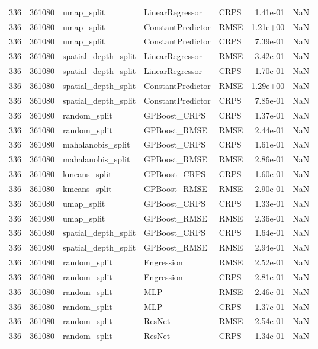 \begin{tabular}{rrlllrr}
336 & 361080 & umap\_split & LinearRegressor & CRPS & 1.41e-01 & NaN \\
336 & 361080 & umap\_split & ConstantPredictor & RMSE & 1.21e+00 & NaN \\
336 & 361080 & umap\_split & ConstantPredictor & CRPS & 7.39e-01 & NaN \\
336 & 361080 & spatial\_depth\_split & LinearRegressor & RMSE & 3.42e-01 & NaN \\
336 & 361080 & spatial\_depth\_split & LinearRegressor & CRPS & 1.70e-01 & NaN \\
336 & 361080 & spatial\_depth\_split & ConstantPredictor & RMSE & 1.29e+00 & NaN \\
336 & 361080 & spatial\_depth\_split & ConstantPredictor & CRPS & 7.85e-01 & NaN \\
336 & 361080 & random\_split & GPBoost\_CRPS & CRPS & 1.37e-01 & NaN \\
336 & 361080 & random\_split & GPBoost\_RMSE & RMSE & 2.44e-01 & NaN \\
336 & 361080 & mahalanobis\_split & GPBoost\_CRPS & CRPS & 1.61e-01 & NaN \\
336 & 361080 & mahalanobis\_split & GPBoost\_RMSE & RMSE & 2.86e-01 & NaN \\
336 & 361080 & kmeans\_split & GPBoost\_CRPS & CRPS & 1.60e-01 & NaN \\
336 & 361080 & kmeans\_split & GPBoost\_RMSE & RMSE & 2.90e-01 & NaN \\
336 & 361080 & umap\_split & GPBoost\_CRPS & CRPS & 1.33e-01 & NaN \\
336 & 361080 & umap\_split & GPBoost\_RMSE & RMSE & 2.36e-01 & NaN \\
336 & 361080 & spatial\_depth\_split & GPBoost\_CRPS & CRPS & 1.64e-01 & NaN \\
336 & 361080 & spatial\_depth\_split & GPBoost\_RMSE & RMSE & 2.94e-01 & NaN \\
336 & 361080 & random\_split & Engression & RMSE & 2.52e-01 & NaN \\
336 & 361080 & random\_split & Engression & CRPS & 2.81e-01 & NaN \\
336 & 361080 & random\_split & MLP & RMSE & 2.46e-01 & NaN \\
336 & 361080 & random\_split & MLP & CRPS & 1.37e-01 & NaN \\
336 & 361080 & random\_split & ResNet & RMSE & 2.54e-01 & NaN \\
336 & 361080 & random\_split & ResNet & CRPS & 1.34e-01 & NaN \\

\end{tabular}
